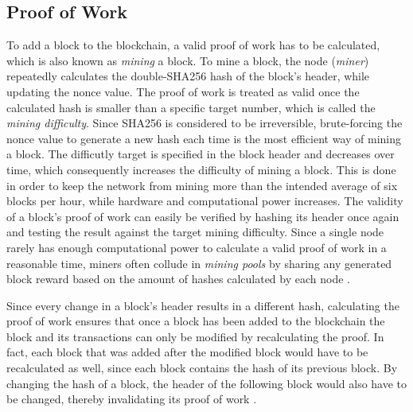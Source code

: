 \documentclass[a4paper,12pt,twoside]{report}
\begin{document}
\subsection{Proof of Work} \label{pow}
To add a block to the blockchain, a valid proof of work has to be calculated, which is also known as \textit{mining} a block. To mine a block, the node (\textit{miner}) repeatedly calculates the double-SHA256 hash of the block's header, while updating the nonce value. The proof of work is treated as valid once the calculated hash is smaller than a specific target number, which is called the \textit{mining difficulty}. Since SHA256 is considered to be irreversible, brute-forcing the nonce value to generate a new hash each time is the most efficient way of mining a block. The difficutly target is specified in the block header and decreases over time, which consequently increases the difficulty of mining a block. This is done in order to keep the network from mining more than the intended average of six blocks per hour, while hardware and computational power increases. The validity of a block's proof of work can easily be verified by hashing its header once again and testing the result against the target mining difficulty. Since a single node rarely has enough computational power to calculate a valid proof of work in a reasonable time, miners often collude in \textit{mining pools} by sharing any generated block reward based on the amount of hashes calculated by each node \cite{antonopoulos2017mastering,okupski2014bitcoin}.

Since every change in a block's header results in a different hash, calculating the proof of work ensures that once a block has been added to the blockchain the block and its transactions can only be modified by recalculating the proof. In fact, each block that was added after the modified block would have to be recalculated as well, since each block contains the hash of its previous block. By changing the hash of a block, the header of the following block would also have to be changed, thereby invalidating its proof of work \cite{nakamoto2008bitcoin}.
\end{document}
